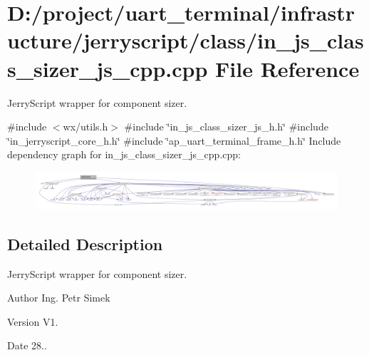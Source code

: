 \section{D\+:/project/uart\+\_\+terminal/infrastructure/jerryscript/class/in\+\_\+js\+\_\+class\+\_\+sizer\+\_\+js\+\_\+cpp.cpp File Reference}
\label{in__js__class__sizer__js__cpp_8cpp}


Jerry\+Script wrapper for component sizer.  


{\ttfamily \#include $<$wx/utils.\+h$>$}\newline
{\ttfamily \#include \char`\"{}in\+\_\+js\+\_\+class\+\_\+sizer\+\_\+js\+\_\+h.\+h\char`\"{}}\newline
{\ttfamily \#include \char`\"{}in\+\_\+jerryscript\+\_\+core\+\_\+h.\+h\char`\"{}}\newline
{\ttfamily \#include \char`\"{}ap\+\_\+uart\+\_\+terminal\+\_\+frame\+\_\+h.\+h\char`\"{}}\newline
Include dependency graph for in\+\_\+js\+\_\+class\+\_\+sizer\+\_\+js\+\_\+cpp.\+cpp\+:
\nopagebreak
\begin{figure}[H]
\begin{center}
\leavevmode
\includegraphics[width=350pt]{in__js__class__sizer__js__cpp_8cpp__incl}
\end{center}
\end{figure}


\subsection{Detailed Description}
Jerry\+Script wrapper for component sizer. 

\begin{DoxyAuthor}{Author}
Ing. Petr Simek 
\end{DoxyAuthor}
\begin{DoxyVersion}{Version}
V1. 
\end{DoxyVersion}
\begin{DoxyDate}{Date}
28.. 
\end{DoxyDate}
